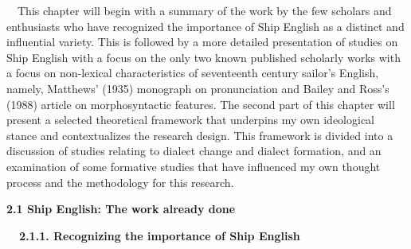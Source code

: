 \begin{styleStandard}
\ \ This chapter will begin with a summary of the work by the few scholars and enthusiasts who have recognized the importance of Ship English as a distinct and influential variety. This is followed by a more detailed presentation of studies on Ship English with a focus on the only two known published scholarly works with a focus on non-lexical characteristics of seventeenth century sailor’s English, namely, Matthews’ (1935) monograph on pronunciation and Bailey and Ross’s (1988) article on morphosyntactic features. The second part of this chapter will present a selected theoretical framework that underpins my own ideological stance and contextualizes the research design. This framework is divided into a discussion of studies relating to dialect change and dialect formation, and an examination of some formative studies that have influenced my own thought process and the methodology for this research. 
\end{styleStandard}


\begin{styleStandard}
\textbf{2.1 Ship English: The work already done}
\end{styleStandard}


\begin{styleStandard}
\textbf{\ \ 2.1.1. Recognizing the importance of Ship English}
\end{styleStandard}


